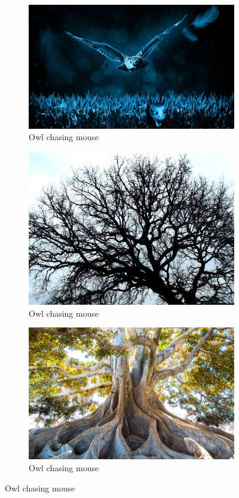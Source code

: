 \documentclass[]{article}
\begin{document}
\begin{figure}[H]
	\caption{How to obtain energy}
	\begin{subfigure}[t]{0.3\textwidth}
		\caption{Owl chasing mouse}\label{fig:owl-mouse}
		\includegraphics[width=\textwidth]{owl-mouse}
	\end{subfigure}
	\;\;\;
	\begin{subfigure}[t]{0.3\textwidth}
		\caption{Owl chasing mouse}\label{fig:tree-above-ground}
		\includegraphics[width=\textwidth]{tree-above-ground}
	\end{subfigure}
	\;\;\;
	\begin{subfigure}[t]{0.3\textwidth}
		\caption{Owl chasing mouse}\label{fig:tree-roots}
		\includegraphics[width=\textwidth]{tree-roots}

\end{subfigure}
\end{figure}
\end{document}
